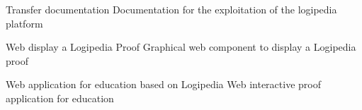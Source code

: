 \begin{workpackage}[id=access,wphases=0-48,type=MGT,
  short=Access,%
  title={Access to the infrastructure},
  lead=Inr,
  InrRM=28,%
  OcaRM=6]
\begin{wpdelivs}
  \begin{wpdeliv}[due=48,miles=???,id=transfer-doc,dissem=PU,nature=R,lead=Irt]{Transfer documentation}
    Documentation for the exploitation of the logipedia platform
  \end{wpdeliv}

  \begin{wpdeliv}[due=36,miles=???,id=edu-display,dissem=PU,nature=D,lead=Edu]{Web display a Logipedia Proof}
    Graphical web component to display a Logipedia proof
  \end{wpdeliv}

  \begin{wpdeliv}[due=36,miles=???,id=edu-app,dissem=PU,nature=OTHER,lead=Edu]{Web application for education based on Logipedia}
    Web interactive proof application for education
  \end{wpdeliv}

\end{wpdelivs}

\end{workpackage}

